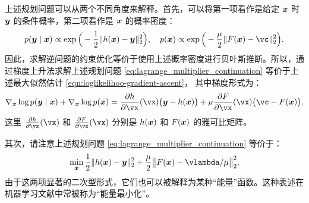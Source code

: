 \documentclass[../../book-main.tex]{subfiles}
\begin{document}
上述规划问题可以从两个不同角度来解释。首先，可以将第一项看作是给定 $\bm{x}$ 时 $\bm{y}$ 的条件概率，第二项看作是 $\bm{x}$ 的概率密度：
\begin{equation}
  p(\y\mid \x) \propto \exp\Big(- \frac{1}{2}\|h(\x) - \y\|_2^2\Big), \quad 
    p(\x) \propto \exp\Big( - \frac{\mu}{2}\|F(\x) - \vc\|_2^2\Big).
\end{equation} 
因此，求解逆问题的约束优化等价于使用上述概率密度进行贝叶斯推断。所以，通过梯度上升法求解上述规划问题 \eqref{eq:lagrange_multiplier_continuation} 等价于上述最大似然估计 \eqref{eqn:loglikelihoo-gradient-ascent}，
其中梯度形式为：
\begin{equation}
   \nabla_{\x} \log p(\y \mid \x) + \nabla_{\x} \log p(\x)   =  \pdv{h}{\vx}(\vx)\big(\y - h(\x)\big) + \mu \pdv{F}{\vx}(\vx)\big(\vc - F(\x)\big),
\end{equation}
这里 $\pdv{h}{\vx}(\vx)$ 和 $\pdv{F}{\vx}(\vx)$ 分别是 $h(\bm{x})$ 和 $F(\bm{x})$ 的雅可比矩阵。

其次，请注意上述规划问题 \eqref{eq:lagrange_multiplier_continuation} 等价于：
\begin{equation}
\min_{\x} \frac{1}{2}\|h(\x) - \y\|_2^2 + \frac{\mu}{2} \big\|F(\x) - \vlambda/\mu\big\|_2^2,
\label{eqn:energy-minimization}
\end{equation} 
由于这两项显著的二次型形式，它们也可以被解释为某种“能量”函数。这种表述在机器学习文献中常被称为“能量最小化”。

\end{document}
